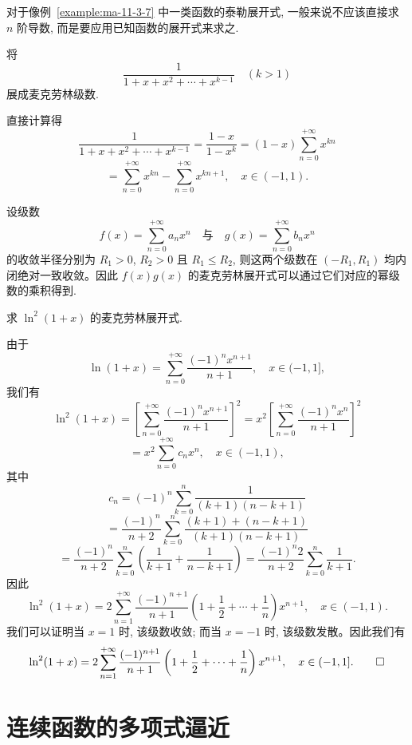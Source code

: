 \begin{remark}\label{remark:ma-11-source-52}
对于像例~\ref{example:ma-11-3-7} 中一类函数的泰勒展开式, 一般来说不应该直接求 $n$ 阶导数, 而是要应用已知函数的展开式来求之.
\end{remark}


\begin{example}\label{example:ma-11-3-8}
将
\[
  \frac1{1+x+x^2+\cdots+x^{k-1}}\quad(k>1)
\]
展成麦克劳林级数.
\end{example}


\begin{solve}
直接计算得
\[
  \frac1{1+x+x^2+\cdots+x^{k-1}}
  =
  \frac{1-x}{1-x^k}
  =
  (1-x)\sum_{n=0}^{+\infty}x^{kn}
\]
\[
  =
  \sum_{n=0}^{+\infty}x^{kn}
  -
  \sum_{n=0}^{+\infty}x^{kn+1},
  \quad x\in(-1,1).
\]

设级数
\[
  f(x)=\sum_{n=0}^{+\infty}a_nx^n
  \quad\text{与}\quad
  g(x)=\sum_{n=0}^{+\infty}b_nx^n
\]
的收敛半径分别为 $R_1>0$, $R_2>0$ 且 $R_1\leqslant R_2$, 则这两个级数在 $(-R_1,R_1)$ 均内闭绝对一致收敛。因此 $f(x)g(x)$ 的麦克劳林展开式可以通过它们对应的幂级数的乘积得到.
\end{solve}


\begin{example}\label{example:ma-11-3-9}
求 $\ln^2(1+x)$ 的麦克劳林展开式.
\end{example}


\begin{solve}
由于
\[
  \ln(1+x)=\sum_{n=0}^{+\infty}\frac{(-1)^nx^{n+1}}{n+1},
  \quad x\in(-1,1],
\]
我们有
\[
  \ln^2(1+x)
  =
  \left[\sum_{n=0}^{+\infty}\frac{(-1)^nx^{n+1}}{n+1}\right]^2
  =
  x^2\left[\sum_{n=0}^{+\infty}\frac{(-1)^nx^n}{n+1}\right]^2
\]
\[
  =
  x^2\sum_{n=0}^{+\infty}c_nx^n,
  \quad x\in(-1,1),
\]
其中
\[
  c_n
  =
  (-1)^n\sum_{k=0}^{n}\frac1{(k+1)(n-k+1)}
\]
\[
  =
  \frac{(-1)^n}{n+2}
  \sum_{k=0}^{n}
  \frac{(k+1)+(n-k+1)}{(k+1)(n-k+1)}
\]
\[
  =
  \frac{(-1)^n}{n+2}
  \sum_{k=0}^{n}
  \left(\frac1{k+1}+\frac1{n-k+1}\right)
  =
  \frac{(-1)^n2}{n+2}\sum_{k=0}^{n}\frac1{k+1}.
\]
因此
\[
  \ln^2(1+x)
  =
  2\sum_{n=1}^{+\infty}
  \frac{(-1)^{n+1}}{n+1}
  \left(1+\frac12+\cdots+\frac1n\right)x^{n+1},
  \quad x\in(-1,1).
\]
我们可以证明当 $x=1$ 时, 该级数收敛; 而当 $x=-1$ 时, 该级数发散。因此我们有
\[
  \ln^2(1+x)
  =
  2\sum_{n=1}^{+\infty}
  \frac{(-1)^{n+1}}{n+1}
  \left(1+\frac12+\cdots+\frac1n\right)x^{n+1},
  \quad x\in(-1,1].
\qedhere
\]
\end{solve}


\section{连续函数的多项式逼近}
\label{sec:ma-11-4}

